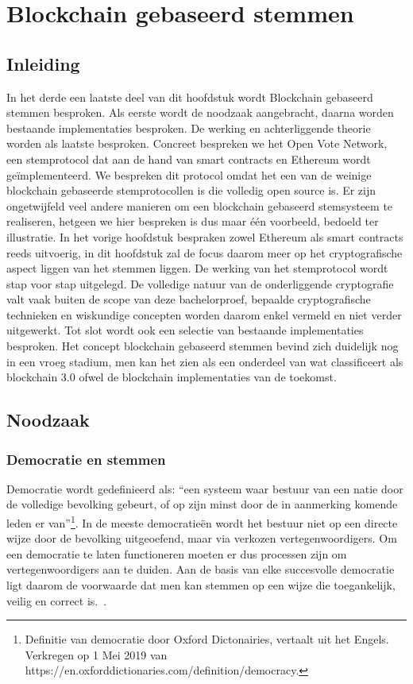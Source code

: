 		\newpage
\section{Blockchain gebaseerd stemmen}
\label{sec:blockchain-gebaseerd-stemmen}
	\subsection*{Inleiding}
			In het derde een laatste deel van dit hoofdstuk wordt Blockchain gebaseerd stemmen besproken.  Als eerste wordt de noodzaak aangebracht, daarna worden bestaande implementaties besproken. De werking en achterliggende theorie worden als laatste besproken. Concreet bespreken we het Open Vote Network, een stemprotocol dat  aan de hand van smart contracts en Ethereum wordt geïmplementeerd. We bespreken dit protocol omdat het een van de weinige blockchain gebaseerde stemprotocollen is die volledig open source is. Er zijn ongetwijfeld veel andere manieren om een blockchain gebaseerd stemsysteem te realiseren,  hetgeen we hier bespreken is dus maar één voorbeeld, bedoeld ter illustratie.  In het vorige hoofdstuk bespraken zowel Ethereum als smart contracts reeds uitvoerig, in dit hoofdstuk zal de focus daarom meer op het cryptografische aspect liggen van het stemmen liggen. De werking van het stemprotocol wordt stap voor stap uitgelegd. De volledige natuur van de onderliggende cryptografie valt vaak buiten de scope van deze bachelorproef, bepaalde cryptografische technieken en wiskundige concepten worden daarom enkel vermeld en niet verder uitgewerkt. Tot slot wordt ook een selectie van bestaande implementaties besproken.
			Het concept blockchain gebaseerd stemmen bevind zich duidelijk nog in een vroeg stadium, men kan het zien als een onderdeel van wat \textcite{Swan2015} classificeert als blockchain 3.0 ofwel de blockchain implementaties van de toekomst.
	\subsection{Noodzaak}
			\subsubsection{Democratie en stemmen}
			Democratie wordt gedefinieerd als: ``een systeem waar bestuur van een natie door de volledige bevolking gebeurt, of op zijn minst door de in aanmerking komende leden er van''\footnote{ Definitie van democratie door Oxford Dictonairies, vertaalt uit het Engels. Verkregen op 1 Mei 2019 van https://en.oxforddictionaries.com/definition/democracy.}. In de meeste democratieën wordt het bestuur niet op een directe wijze door de bevolking uitgeoefend, maar via verkozen vertegenwoordigers. Om een democratie te laten functioneren moeten er dus processen zijn om vertegenwoordigers aan te duiden.  Aan de basis van elke succesvolle democratie ligt daarom de voorwaarde dat men kan stemmen op een wijze die toegankelijk, veilig en correct is.~\autocite{Osgood2016}. 
			
